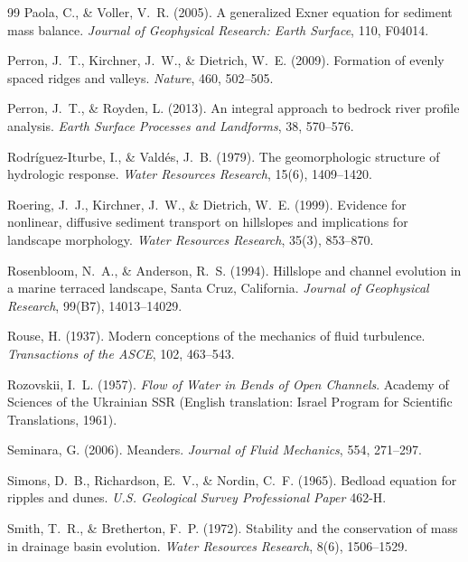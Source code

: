\documentclass[11pt,letterpaper]{article}
\numberwithin{equation}{section}
\begin{document}
\begin{thebibliography}{99}
Paola, C., \& Voller, V.~R. (2005). A generalized Exner equation for sediment mass balance. \emph{Journal of Geophysical
Research: Earth Surface}, 110, F04014.

Perron, J.~T., Kirchner, J.~W., \& Dietrich, W.~E. (2009). Formation of evenly spaced ridges and valleys. \emph{Nature}, 460,
502--505.

Perron, J.~T., \& Royden, L. (2013). An integral approach to bedrock river profile analysis. \emph{Earth Surface Processes and
Landforms}, 38, 570--576.

Rodr\'iguez-Iturbe, I., \& Vald\'es, J.~B. (1979). The geomorphologic structure of hydrologic response. \emph{Water Resources
Research}, 15(6), 1409--1420.

Roering, J.~J., Kirchner, J.~W., \& Dietrich, W.~E. (1999). Evidence for nonlinear, diffusive sediment transport on hillslopes
and implications for landscape morphology. \emph{Water Resources Research}, 35(3), 853--870.

Rosenbloom, N.~A., \& Anderson, R.~S. (1994). Hillslope and channel evolution in a marine terraced landscape, Santa Cruz,
California. \emph{Journal of Geophysical Research}, 99(B7), 14013--14029.

Rouse, H. (1937). Modern conceptions of the mechanics of fluid turbulence. \emph{Transactions of the ASCE}, 102, 463--543.

Rozovskii, I.~L. (1957). \emph{Flow of Water in Bends of Open Channels}. Academy of Sciences of the Ukrainian SSR (English
translation: Israel Program for Scientific Translations, 1961).

Seminara, G. (2006). Meanders. \emph{Journal of Fluid Mechanics}, 554, 271--297.

Simons, D.~B., Richardson, E.~V., \& Nordin, C.~F. (1965). Bedload equation for ripples and dunes. \emph{U.S. Geological Survey
Professional Paper} 462-H.

Smith, T.~R., \& Bretherton, F.~P. (1972). Stability and the conservation of mass in drainage basin evolution. \emph{Water
Resources Research}, 8(6), 1506--1529.


\end{thebibliography}
\end{document}
